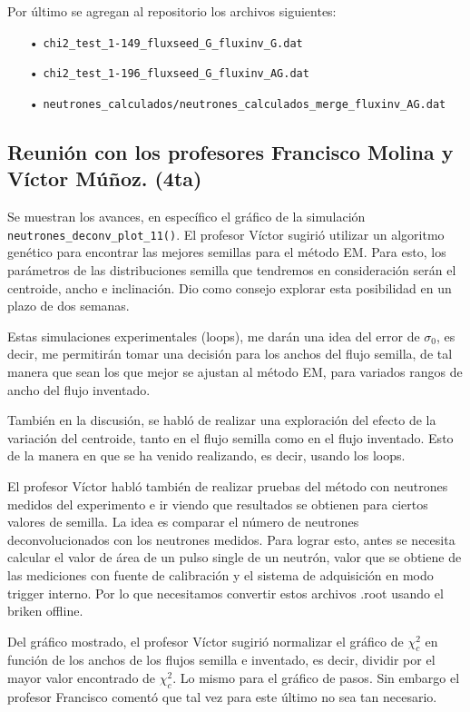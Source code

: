 \documentclass[11pt,letterpaper]{article}
\begin{document}
Por último se agregan al repositorio los archivos siguientes: 

\begin{itemize}
\item[•]\verb|chi2_test_1-149_fluxseed_G_fluxinv_G.dat|
\item[•]\verb|chi2_test_1-196_fluxseed_G_fluxinv_AG.dat|
\item[•]\verb|neutrones_calculados/neutrones_calculados_merge_fluxinv_AG.dat|
\end{itemize}


\subsection*{Reunión con los profesores Francisco Molina y Víctor Múñoz. (4ta)} 
Se muestran los avances, en específico el gráfico de la simulación \verb|neutrones_deconv_plot_11()|. El profesor Víctor sugirió utilizar un algoritmo genético para encontrar las mejores semillas para el método EM. Para esto, los parámetros de las distribuciones semilla que tendremos en consideración serán el centroide, ancho e inclinación. Dio como consejo explorar esta posibilidad en un plazo de dos semanas. 

Estas simulaciones experimentales (loops), me darán una idea del error de $\sigma_0$, es decir, me permitirán tomar una decisión para los anchos del flujo semilla, de tal manera que sean los que mejor se ajustan al método EM, para variados rangos de ancho del flujo inventado.

También en la discusión, se habló de realizar una exploración del efecto de la variación del centroide, tanto en el flujo semilla como en el flujo inventado. Esto de la manera en que se ha venido realizando, es decir, usando los loops.

El profesor Víctor habló también de realizar pruebas del método con neutrones medidos del experimento e ir viendo que resultados se obtienen para ciertos valores de semilla. La idea es comparar el número de neutrones deconvolucionados con los neutrones medidos. Para lograr esto, antes se necesita calcular el valor de área de un pulso single de un neutrón, valor que se obtiene de las mediciones con fuente de calibración y el sistema de adquisición en modo trigger interno. Por lo que necesitamos convertir estos archivos .root usando el briken offline.

Del gráfico mostrado, el profesor Víctor sugirió normalizar el gráfico de $\chi_c^2$ en función de los anchos de los flujos semilla e inventado, es decir, dividir por el mayor valor encontrado de $\chi_c^2$. Lo mismo para el gráfico de pasos. Sin embargo el profesor Francisco comentó que tal vez para este último no sea tan necesario.
\end{document}
